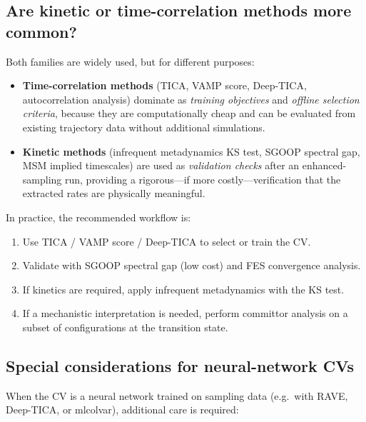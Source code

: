 \documentclass[12pt, a4paper]{article}
\begin{document}
\subsection{Are kinetic or time-correlation methods more common?}

Both families are widely used, but for different purposes:

\begin{itemize}[noitemsep]
  \item \textbf{Time-correlation methods} (TICA, VAMP score, Deep-TICA, 
        autocorrelation analysis) dominate as \emph{training objectives} 
        and \emph{offline selection criteria}, because they are 
        computationally cheap and can be evaluated from existing 
        trajectory data without additional simulations.

  \item \textbf{Kinetic methods} (infrequent metadynamics KS test, 
        SGOOP spectral gap, MSM implied timescales) are used as 
        \emph{validation checks} after an enhanced-sampling run, 
        providing a rigorous---if more costly---verification that 
        the extracted rates are physically meaningful.
\end{itemize}

In practice, the recommended workflow is:
\begin{enumerate}[noitemsep]
  \item Use TICA / VAMP score / Deep-TICA to select or train the CV.
  \item Validate with SGOOP spectral gap (low cost) and FES 
        convergence analysis.
  \item If kinetics are required, apply infrequent metadynamics with 
        the KS test.
  \item If a mechanistic interpretation is needed, perform committor 
        analysis on a subset of configurations at the transition state.
\end{enumerate}

\subsection{Special considerations for neural-network CVs}

When the CV is a neural network trained on sampling data (e.g.\ with 
RAVE, Deep-TICA, or mlcolvar), additional care is required:
\end{document}
